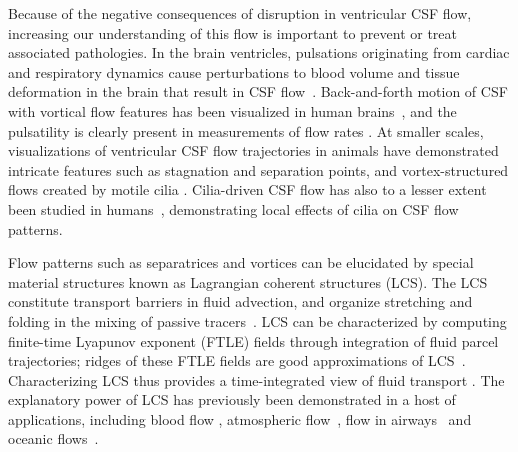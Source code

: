 \documentclass{template}
\begin{document}
Because of the negative consequences of disruption in
ventricular CSF flow, increasing our understanding of
this flow is important to prevent or treat associated 
pathologies. In the brain ventricles, 
pulsations originating from cardiac and respiratory dynamics
cause perturbations to blood volume and tissue deformation
in the brain that result in 
CSF flow~\citep{enzmann1991normal,
wagshul2011pulsating, Liu2024UsingBreathing, baledent2004relationship,
greitz1992pulsatile, Vinje2019RespiratoryMeasurements,
kelley2023cerebrospinal, greitz1993pulsatile}.
Back-and-forth motion of CSF with vortical flow features
has been visualized in human brains~\citep{stadlbauer2010insight},
and the pulsatility is clearly present in measurements of flow rates
\citep{baledent2004relationship, Liu2024UsingBreathing, Vinje2019RespiratoryMeasurements}.
At smaller scales, visualizations of ventricular
CSF flow trajectories in animals have demonstrated
intricate features such as stagnation and separation points,
and vortex-structured flows created by motile cilia
\citep{gilpin2017flowtrace, Faubel2016CiliaVentricles,
Olstad2019CiliaryDevelopment}.
Cilia-driven CSF flow has also 
to a lesser extent been studied in humans~\citep{worthington1963ependymal,
Yoshida2022EffectVentricles, Siyahhan2014FlowVentricles},
demonstrating local effects of cilia on CSF flow patterns.

Flow patterns such as separatrices and vortices can be elucidated by special
material structures known as Lagrangian coherent
structures (LCS). The LCS constitute transport barriers in
fluid advection, and organize stretching and 
folding in the mixing of passive tracers~\citep{haller2015lagrangian,
haller2000lagrangian}. LCS can be characterized by computing
finite-time Lyapunov exponent (FTLE) fields through integration of fluid
parcel trajectories; ridges of these FTLE fields are good approximations of
LCS~\citep{shadden2005definition}. Characterizing LCS thus provides
a time-integrated view of fluid transport
\citep{shadden2005definition, haller2015lagrangian, haller2000lagrangian}.
The explanatory power of LCS has previously been demonstrated
in a host of applications, including blood flow
\citep{shadden2008characterization, shadden2010computational},
atmospheric flow~\citep{Gunther2021LagrangianWinds},
flow in airways~\citep{lukens2010using}
and oceanic flows~\citep{beron2015dissipative}.
\end{document}
